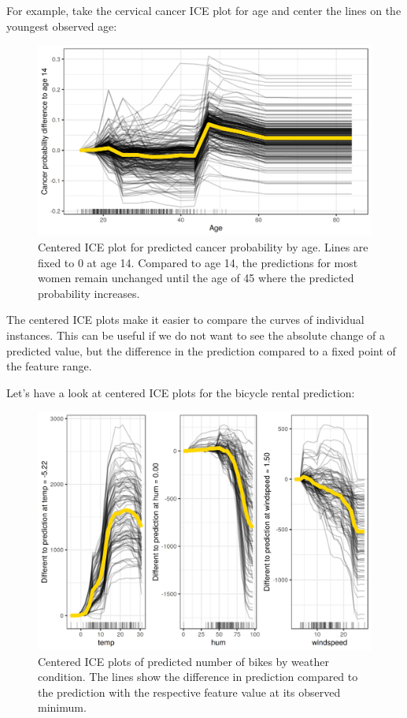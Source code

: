 \documentclass[12pt,]{krantz}
\begin{document}
For example, take the cervical cancer ICE plot for age and center the
lines on the youngest observed age:

\begin{figure}

{\centering \includegraphics[width=\textwidth]{images/ice-cervical-centered-1} 

}

\caption{Centered ICE plot for predicted  cancer probability by age. Lines are fixed to 0 at age 14. Compared to age 14, the predictions for most women remain unchanged until the age of 45 where the predicted probability increases.}\label{fig:ice-cervical-centered}
\end{figure}

The centered ICE plots make it easier to compare the curves of
individual instances. This can be useful if we do not want to see the
absolute change of a predicted value, but the difference in the
prediction compared to a fixed point of the feature range.

Let's have a look at centered ICE plots for the bicycle rental
prediction:

\begin{figure}

{\centering \includegraphics[width=\textwidth]{images/ice-bike-centered-1} 

}

\caption{Centered ICE plots of predicted number of bikes by weather condition. The lines show the difference in prediction compared to the prediction with the respective feature value at its observed minimum.}\label{fig:ice-bike-centered}
\end{figure}
\end{document}
